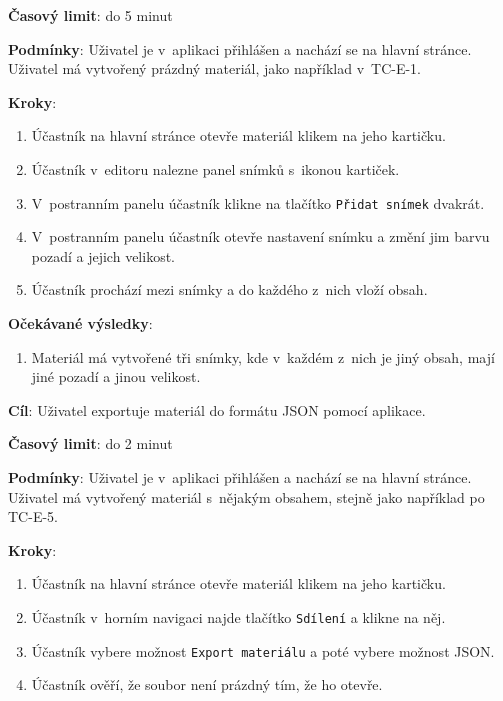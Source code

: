 \textbf{Časový limit}: do 5 minut

\textbf{Podmínky}:  Uživatel je v~aplikaci přihlášen a nachází se na hlavní stránce. Uživatel má vytvořený prázdný materiál, jako například v~TC-E-1.

\textbf{Kroky}:

\begin{enumerate}[leftmargin=1.4cm]
    \item Účastník na hlavní stránce otevře materiál klikem na jeho kartičku.
    \item Účastník v~editoru nalezne panel snímků s~ikonou kartiček.
    \item V~postranním panelu účastník klikne na tlačítko \verb|Přidat snímek| dvakrát.
    \item V~postranním panelu účastník otevře nastavení snímku a změní jim barvu pozadí a jejich velikost.
    \item Účastník prochází mezi snímky a do každého z~nich vloží obsah.
\end{enumerate}

\textbf{Očekávané výsledky}:

\begin{enumerate}[leftmargin=1.4cm]
    \item Materiál má vytvořené tři snímky, kde v~každém z~nich je jiný obsah, mají jiné pozadí a jinou velikost.
\end{enumerate}






\vspace{1em}

\textbf{Cíl}: Uživatel exportuje materiál do formátu JSON pomocí aplikace.

\textbf{Časový limit}: do 2 minut

\textbf{Podmínky}:  Uživatel je v~aplikaci přihlášen a nachází se na hlavní stránce. Uživatel má vytvořený materiál s~nějakým obsahem, stejně jako například po TC-E-5.

\textbf{Kroky}:

\begin{enumerate}[leftmargin=1.4cm]
    \item Účastník na hlavní stránce otevře materiál klikem na jeho kartičku.
    \item Účastník v~horním navigaci najde tlačítko \verb|Sdílení| a klikne na něj.
    \item Účastník vybere možnost \verb|Export materiálu| a poté vybere možnost JSON.
    \item Účastník ověří, že soubor není prázdný tím, že ho otevře.
\end{enumerate}

